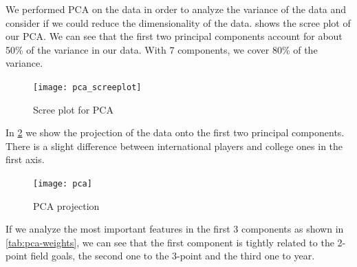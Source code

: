 We performed PCA on the data in order to analyze the variance of the data and
consider if we could reduce the dimensionality of the data. 
shows the scree plot of our PCA. We can see that the first two principal
components account for about 50\% of the variance in our data. With 7
components, we cover 80\% of the variance.

\begin{figure}[H]
  \texttt{[image: pca\_screeplot]}
  \caption{Scree plot for PCA}%
  \label{fig:pca-scree}
\end{figure}

In \cref{fig:pca} we show the projection of the data onto the first two principal
components. There is a slight difference between international players and college ones
in the first axis.

\begin{figure}[H]
  \texttt{[image: pca]}
  \caption{PCA projection}%
  \label{fig:pca}
\end{figure}

If we analyze the most important features in the first 3 components as shown in
\cref{tab:pca-weights}, we can see that the first component is tightly related
to the 2-point field goals, the second one to the 3-point and the third one to
year.

